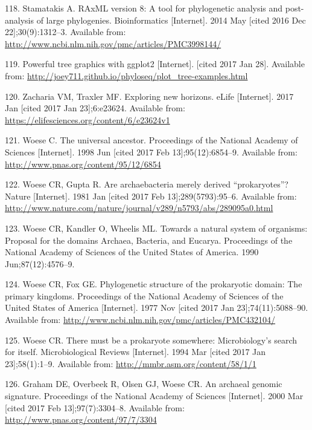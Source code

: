 \documentclass[12pt,twoside]{reedthesis}
\begin{document}
{  \hypertarget{ref-stamatakis_raxml_2014}{}
  118. Stamatakis A. RAxML version 8: A tool for phylogenetic analysis and
  post-analysis of large phylogenies. Bioinformatics {[}Internet{]}. 2014
  May {[}cited 2016 Dec 22{]};30(9):1312--3. Available from:
  \url{http://www.ncbi.nlm.nih.gov/pmc/articles/PMC3998144/}
  
  \hypertarget{ref-phyloseq_powerful_2016}{}
  119. Powerful tree graphics with ggplot2 {[}Internet{]}. {[}cited 2017
  Jan 28{]}. Available from:
  \url{http://joey711.github.io/phyloseq/plot_tree-examples.html}
  
  \hypertarget{ref-zacharia_exploring_2017}{}
  120. Zacharia VM, Traxler MF. Exploring new horizons. eLife
  {[}Internet{]}. 2017 Jan {[}cited 2017 Jan 23{]};6:e23624. Available
  from: \url{https://elifesciences.org/content/6/e23624v1}
  
  \hypertarget{ref-woese_universal_1998}{}
  121. Woese C. The universal ancestor. Proceedings of the National
  Academy of Sciences {[}Internet{]}. 1998 Jun {[}cited 2017 Feb
  13{]};95(12):6854--9. Available from:
  \url{http://www.pnas.org/content/95/12/6854}
  
  \hypertarget{ref-woese_are_1981}{}
  122. Woese CR, Gupta R. Are archaebacteria merely derived
  ``prokaryotes''? Nature {[}Internet{]}. 1981 Jan {[}cited 2017 Feb
  13{]};289(5793):95--6. Available from:
  \url{http://www.nature.com/nature/journal/v289/n5793/abs/289095a0.html}
  
  \hypertarget{ref-woese_towards_1990}{}
  123. Woese CR, Kandler O, Wheelis ML. Towards a natural system of
  organisms: Proposal for the domains Archaea, Bacteria, and Eucarya.
  Proceedings of the National Academy of Sciences of the United States of
  America. 1990 Jun;87(12):4576--9.
  
  \hypertarget{ref-woese_phylogenetic_1977}{}
  124. Woese CR, Fox GE. Phylogenetic structure of the prokaryotic domain:
  The primary kingdoms. Proceedings of the National Academy of Sciences of
  the United States of America {[}Internet{]}. 1977 Nov {[}cited 2017 Jan
  23{]};74(11):5088--90. Available from:
  \url{http://www.ncbi.nlm.nih.gov/pmc/articles/PMC432104/}
  
  \hypertarget{ref-woese_there_1994}{}
  125. Woese CR. There must be a prokaryote somewhere: Microbiology's
  search for itself. Microbiological Reviews {[}Internet{]}. 1994 Mar
  {[}cited 2017 Jan 23{]};58(1):1--9. Available from:
  \url{http://mmbr.asm.org/content/58/1/1}
  
  \hypertarget{ref-graham_archaeal_2000}{}
  126. Graham DE, Overbeek R, Olsen GJ, Woese CR. An archaeal genomic
  signature. Proceedings of the National Academy of Sciences
  {[}Internet{]}. 2000 Mar {[}cited 2017 Feb 13{]};97(7):3304--8.
  Available from: \url{http://www.pnas.org/content/97/7/3304}
  
}
\end{document}
